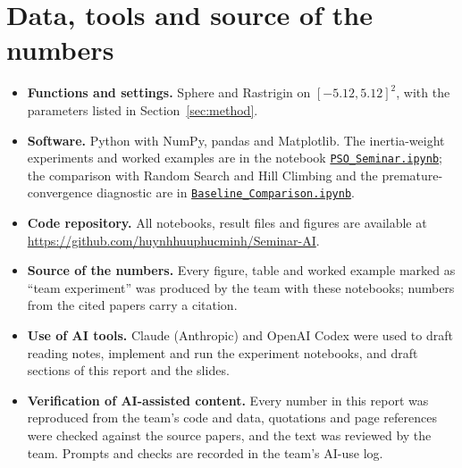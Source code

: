 \documentclass[11pt,a4paper]{article}
\begin{document}
\section*{Data, tools and source of the numbers}
\begin{itemize}
\item \textbf{Functions and settings.} Sphere and Rastrigin on $[-5.12,5.12]^2$, with the parameters listed in Section~\ref{sec:method}.
\item \textbf{Software.} Python with NumPy, pandas and Matplotlib. The inertia-weight experiments and worked examples are in the notebook \href{https://github.com/huynhhuuphucminh/Seminar-AI/blob/main/notebooks/PSO_Seminar.ipynb}{\texttt{PSO\_Seminar.ipynb}}; the comparison with Random Search and Hill Climbing and the premature-convergence diagnostic are in \href{https://github.com/huynhhuuphucminh/Seminar-AI/blob/main/notebooks/Baseline_Comparison.ipynb}{\texttt{Baseline\_Comparison.ipynb}}.
\item \textbf{Code repository.} All notebooks, result files and figures are available at \url{https://github.com/huynhhuuphucminh/Seminar-AI}.
\item \textbf{Source of the numbers.} Every figure, table and worked example marked as ``team experiment'' was produced by the team with these notebooks; numbers from the cited papers carry a citation.
\item \textbf{Use of AI tools.} Claude (Anthropic) and OpenAI Codex were used to draft reading notes, implement and run the experiment notebooks, and draft sections of this report and the slides.
\item \textbf{Verification of AI-assisted content.} Every number in this report was reproduced from the team's code and data, quotations and page references were checked against the source papers, and the text was reviewed by the team. Prompts and checks are recorded in the team's AI-use log.
\end{itemize}
\end{document}
